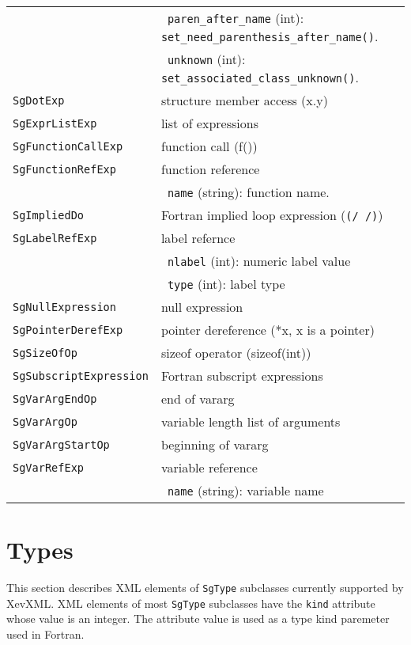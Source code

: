 \begin{longtable}[l]{l|p{10cm}}
 & ~\texttt{paren\_after\_name} (int): \texttt{set\_need\_parenthesis\_after\_name()}.\\
 & ~\texttt{unknown} (int): \texttt{set\_associated\_class\_unknown()}.\\
 \texttt{SgDotExp} & structure member access (x.y)\\
 \texttt{SgExprListExp} & list of expressions \\
 \texttt{SgFunctionCallExp} & function call  (f())\\
 \texttt{SgFunctionRefExp} & function reference\\
 & ~\texttt{name} (string): function name. \\
 \texttt{SgImpliedDo} & Fortran implied loop expression (\texttt{(/ /)})\\
 \texttt{SgLabelRefExp} & label refernce\\
 & ~\texttt{nlabel} (int): numeric label value\\
 & ~\texttt{type} (int): label type\\
 \texttt{SgNullExpression} & null expression \\
 \texttt{SgPointerDerefExp} & pointer dereference (*x, x is a pointer)\\
 \texttt{SgSizeOfOp} & sizeof operator (sizeof(int))\\
 \texttt{SgSubscriptExpression} & Fortran subscript expressions \\
 \texttt{SgVarArgEndOp} & end of vararg\\
 \texttt{SgVarArgOp} & variable length list of arguments \\
 \texttt{SgVarArgStartOp} & beginning of vararg\\
 \texttt{SgVarRefExp} & variable reference \\
 & ~\texttt{name} (string): variable name \\
\end{longtable}


\section{Types}

This section describes XML elements of \texttt{SgType} subclasses
currently supported by XevXML.  XML elements of most \texttt{SgType}
subclasses have the \texttt{kind} attribute whose value is an
integer. The attribute value is used as a type kind paremeter used in
Fortran.

